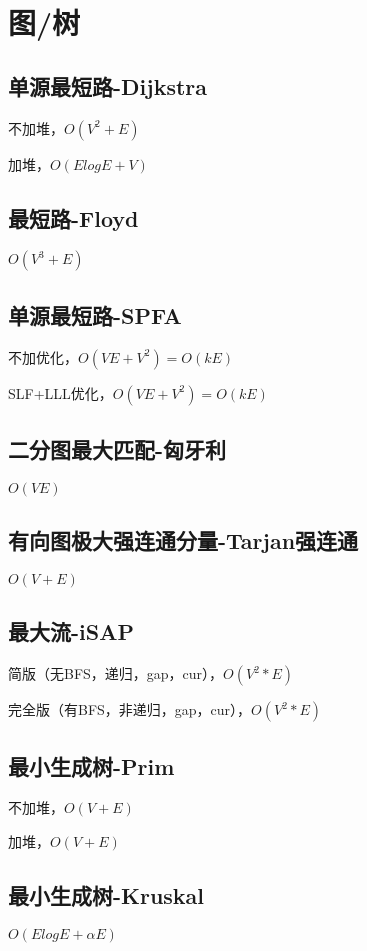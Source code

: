 \documentclass[10pt]{article}
\begin{document}
\section{图/树}
\subsection{单源最短路-Dijkstra}
不加堆，$O(V^2+E)$

加堆，$O(ElogE+V)$


\subsection{最短路-Floyd}
$O(V^3+E)$


\subsection{单源最短路-SPFA}
不加优化，$O(VE+V^2)=O(kE)$

SLF+LLL优化，$O(VE+V^2)=O(kE)$


\subsection{二分图最大匹配-匈牙利}
$O(VE)$


\subsection{有向图极大强连通分量-Tarjan强连通}
$O(V+E)$


\subsection{最大流-iSAP}
简版（无BFS，递归，gap，cur），$O(V^2*E)$

完全版（有BFS，非递归，gap，cur），$O(V^2*E)$


\subsection{最小生成树-Prim}
不加堆，$O(V+E)$

加堆，$O(V+E)$


\subsection{最小生成树-Kruskal}
$O(ElogE+αE)$

\end{document}
